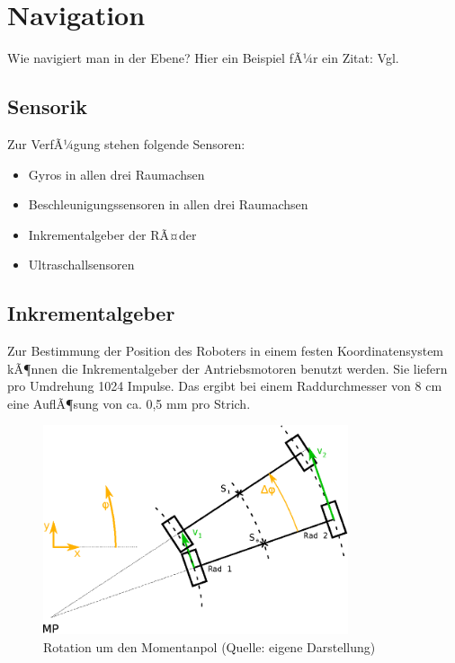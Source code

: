 \renewcommand{\autoren}{Stephan Morongowski}
\newpage
\section{Navigation}

Wie navigiert man in der Ebene? Hier ein Beispiel fÃ¼r ein Zitat: Vgl. \cite{bildungAtmosphaere}

\subsection{Sensorik}
Zur VerfÃ¼gung stehen folgende Sensoren:
\begin{itemize}
\item Gyros in allen drei Raumachsen
\item Beschleunigungssensoren in allen drei Raumachsen
\item Inkrementalgeber der RÃ¤der
\item Ultraschallsensoren
\end{itemize}

\subsection{Inkrementalgeber}

Zur Bestimmung der Position des Roboters in einem festen Koordinatensystem kÃ¶nnen die Inkrementalgeber der Antriebsmotoren benutzt werden.
Sie liefern pro Umdrehung 1024 Impulse. Das ergibt bei einem Raddurchmesser von 8 cm eine AuflÃ¶sung von ca. 0,5 mm pro Strich.

\begin{figure}[h]  %
\centering\includegraphics[width=0.8\textwidth]{images/Kurvenkinematic.eps}
\caption{Rotation um den Momentanpol \newline (Quelle: eigene Darstellung)}
\label{kurvenkinematik}
\end{figure}

